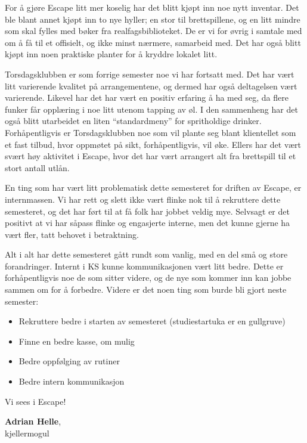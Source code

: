 \documentclass[10pt,norsk,a4paper]{article}
\begin{document}
\begin{multicols}{2}
For å gjøre Escape litt mer koselig har det blitt kjøpt inn noe nytt inventar. Det ble blant annet kjøpt inn
to nye hyller; en stor til brettspillene, og en litt mindre som skal fylles med bøker fra
realfagsbiblioteket. De er vi for øvrig i samtale med om å få til et offisielt, og ikke minst nærmere,
samarbeid med. Det har også blitt kjøpt inn noen praktiske planter for å kryddre lokalet litt.

Torsdagsklubben er som forrige semester noe vi har fortsatt med. Det har vært litt varierende kvalitet på
arrangementene, og dermed har også deltagelsen vært varierende. Likevel har det har vært en positiv erfaring
å ha med seg, da flere funker får opplæring i noe litt utenom tapping av øl. I den sammenheng har det også
blitt utarbeidet en liten “standardmeny” for spritholdige drinker. Forhåpentligvis er Torsdagsklubben noe
som vil plante seg blant klientellet som et fast tilbud, hvor oppmøtet på sikt, forhåpentligvis, vil øke. Ellers har det vært svært høy aktivitet i Escape, hvor det har vært arrangert alt fra brettspill til et stort antall utlån.

En ting som har vært litt problematisk dette semesteret for driften av Escape, er internmassen. Vi har rett
og slett ikke vært flinke nok til å rekruttere dette semesteret, og det har ført til at få folk har jobbet
veldig mye. Selvsagt er det positivt at vi har såpass flinke og engasjerte interne, men det kunne gjerne ha
vært fler, tatt behovet i betraktning.

Alt i alt har dette semesteret gått rundt som vanlig, med en del små og store forandringer. Internt i KS
kunne kommunikasjonen vært litt bedre. Dette er forhåpentligvis noe de som sitter videre, og de nye som
kommer inn kan jobbe sammen om for å forbedre. Videre er det noen ting som burde bli gjort neste semester:
\begin{itemize}
		\item Rekruttere bedre i starten av semesteret (studiestartuka er en gullgruve)
		\item Finne en bedre kasse, om mulig
		\item Bedre oppfølging av rutiner
		\item Bedre intern kommunikasjon
\end{itemize}
\end{multicols}
Vi sees i Escape!

\textbf{Adrian Helle}, \\
kjellermogul \\
\date{24.\ april 2018}
\end{document}
